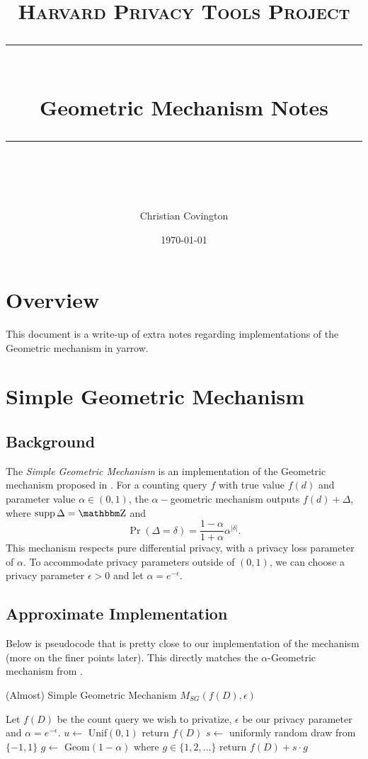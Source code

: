 \documentclass[11pt]{scrartcl} %
\title{
	\normalfont\normalsize
	\textsc{Harvard Privacy Tools Project}\\ %
	\vspace{25pt} %
	\rule{\linewidth}{0.5pt}\\ %
	\vspace{20pt} %
	{\huge Geometric Mechanism Notes}\\ %
	\vspace{12pt} %
	\rule{\linewidth}{2pt}\\ %
	\vspace{12pt} %
}
\author{\LARGE Christian Covington} %
\date{\normalsize\today} %
\begin{document}
\maketitle

\section{Overview}
This document is a write-up of extra notes regarding implementations of the Geometric mechanism
in yarrow.

\section{Simple Geometric Mechanism}
\subsection{Background}
The \emph{Simple Geometric Mechanism} is an implementation of the Geometric
mechanism proposed in \cite{GRS12}. For a counting query $f$ with true value $f(d)$
and parameter value $\alpha \in (0,1)$, the $\alpha-$geometric mechanism outputs
$f(d) + \Delta$, where $\supp \Delta = \Z$ and
\begin{equation}
    \label{eq:grs12_geom}
    \Pr(\Delta = \delta) = \frac{1-\alpha}{1+\alpha} \alpha^{| \delta |}.
\end{equation}
This mechanism respects pure differential privacy, with a privacy loss parameter of $\alpha$.
To accommodate privacy parameters outside of $(0,1)$, we can choose a privacy parameter
$\epsilon > 0$ and let $\alpha = e^{-\epsilon}$. \newline

\subsection{Approximate Implementation}
Below is pseudocode that is pretty close to our implementation of the mechanism (more on the finer points later).
This directly matches the $\alpha$-Geometric mechanism from \cite{GRS12}.

\begin{algorithm}[H]
    \caption{(Almost) Simple Geometric Mechanism $M_{SG}(f(D), \epsilon)$}
    \label{alg:simp_geo_mec}
    \begin{algorithmic}[1]
        \State Let $f(D)$ be the count query we wish to privatize, $\epsilon$ be our privacy parameter and $\alpha = e^{-\epsilon}$.
        \State $u \gets$ Unif$(0,1)$
         \label{alg_step:return_zero}
            \State return $f(D)$
        \Else
            \State $s \gets$ uniformly random draw from $\{-1, 1\}$ \label{alg:unif_draw}
            \State $g \gets$ Geom$(1 - \alpha)$ where $g \in \{1,2,\hdots\}$ \label{alg:draw_geom}
            \State return $f(D) + s \cdot g$
        \EndIf
	\end{algorithmic}
\end{algorithm}
\end{document}
